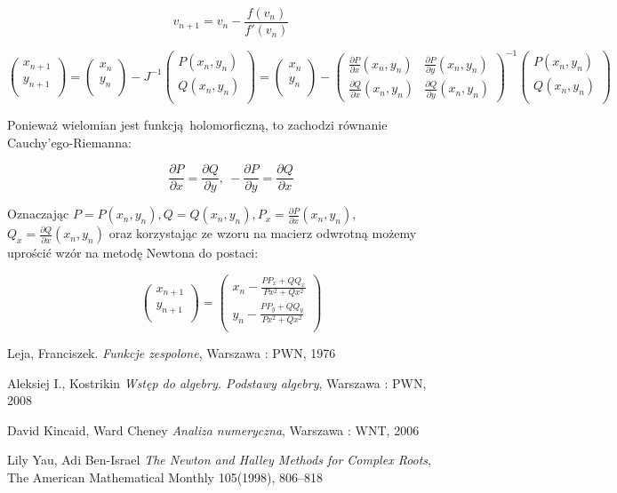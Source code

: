 \documentclass{article}
\begin{document}
$$v_{n+1} = v_n - \frac{f(v_n)}{f'(v_n)}$$

$$
\begin{pmatrix} x_{n+1}\\ y_{n+1}\\ \end{pmatrix} =  \begin{pmatrix} x_n\\ y_n\\ \end{pmatrix} - J^{-1} \begin{pmatrix} P(x_n, y_n)\\ Q(x_n, y_n)\\ \end{pmatrix} = 
\begin{pmatrix} x_n\\ y_n\\ \end{pmatrix} - \begin{pmatrix}
\frac{\partial P}{\partial x}(x_n, y_n) & \frac{\partial P}{\partial y} (x_n, y_n)\\ 
\frac{\partial Q}{\partial x}(x_n, y_n) & \frac{\partial Q}{\partial y}(x_n, y_n)  
\end{pmatrix}^{-1} \begin{pmatrix} P(x_n, y_n)\\ Q(x_n, y_n)\\ \end{pmatrix} $$


Ponieważ wielomian jest funkcją holomorficzną, to zachodzi równanie Cauchy'ego-Riemanna:

$$\frac{\partial P}{\partial x} = \frac{\partial Q}{\partial y}, \ - \frac{\partial P}{\partial y} =\frac{\partial Q}{\partial x}$$

Oznaczając $P = P(x_n, y_n), Q = Q(x_n, y_n), P_x = \frac{\partial P}{\partial x}(x_n, y_n)$, $Q_x = \frac{\partial Q}{\partial x}(x_n, y_n)$ oraz korzystając ze wzoru na macierz odwrotną możemy uprościć wzór na metodę Newtona do postaci:

$$
\begin{pmatrix} x_{n+1}\\ y_{n+1}\\ \end{pmatrix} = \begin{pmatrix} x_n - \frac{ P P_x + Q Q_x}{Px^2 + Qx^2}\\ y_n - \frac{P P_y + Q Q_y}{Px^2 + Qx^2} \\ \end{pmatrix}
$$

\begin{thebibliography}{99}
 Leja, Franciszek.
\emph{Funkcje zespolone},
Warszawa : PWN, 1976

 Aleksiej I., Kostrikin
\emph{Wstęp do algebry. Podstawy algebry},
Warszawa : PWN, 2008

 David Kincaid, Ward Cheney
\emph{Analiza numeryczna},
Warszawa : WNT, 2006

Lily Yau, Adi Ben-Israel
\emph{The Newton and Halley Methods for Complex Roots},
The American Mathematical Monthly 105(1998), 806–818


\end{thebibliography}
\end{document}
